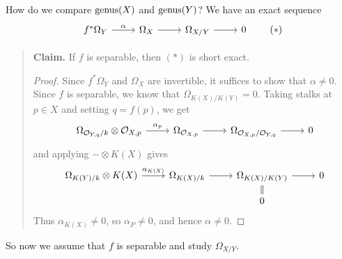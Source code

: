 \begin{remark}
  How do we compare
  $\operatorname{genus}(X)$ and $\operatorname{genus}(Y)$? We have
  an exact sequence
  \[
    \begin{tikzcd}
      f^*\Omega_Y
      \ar[r, "\alpha"] & \Omega_X
      \ar[r] & \Omega_{X/Y} \ar[r] & 0
    \end{tikzcd} \tag{$*$}
  \]
  \begin{quote}
    \textbf{Claim.} If $f$ is separable,
    then $(*)$ is short exact.

    \begin{proof}
      Since $f^* \Omega_Y$ and $\Omega_X$
      are invertible, it suffices to show
      that $\alpha \ne 0$. Since
      $f$ is separable,
      we know that $\Omega_{K(X) / K(Y)} = 0$.
      Taking stalks at $p \in X$ and
      setting $q = f(p)$, we get
      \[
        \begin{tikzcd}
          \Omega_{\OO_{Y, q} / k}
          \otimes \OO_{X, p}
          \ar[r, "\alpha_p"] &
          \Omega_{\OO_{X, p}}
          \ar[r] & 
          \Omega_{\OO_{X, p} / \OO_{Y, q}}
          \ar[r] & 0
        \end{tikzcd}
      \]
      and applying $- \otimes K(X)$ gives
      \[
        \begin{tikzcd}[row sep=small]
          \Omega_{K(Y) / k} \otimes K(X)
          \ar[r, "\alpha_{K(X)}"] &
          \Omega_{K(X) / k}
          \ar[r] & \Omega_{K(X) / K(Y)} \ar[r] & 0 \\
                 & & 0 \ar[u, equal]
        \end{tikzcd}
      \]
      Thus $\alpha_{K(X)} \ne 0$, so
      $\alpha_P \ne 0$, and hence $\alpha \ne 0$.
    \end{proof}
  \end{quote}
  So now we assume that $f$ is separable
  and study $\Omega_{X / Y}$.
\end{remark}
